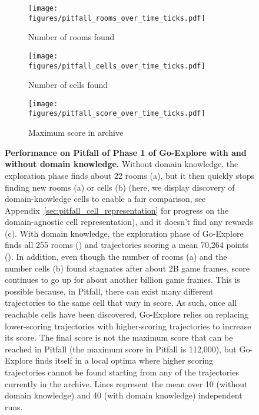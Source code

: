 \documentclass{article}
\begin{document}
\begin{figure}
    \begin{subfigure}[t]{.33\textwidth}
        \centering
        \texttt{[image: figures/pitfall\_rooms\_over\_time\_ticks.pdf]}
        \caption{Number of rooms found}
        \label{fig:pitfall_domain_room}
    \end{subfigure}
    \begin{subfigure}[t]{.33\textwidth}
        \centering
        \texttt{[image: figures/pitfall\_cells\_over\_time\_ticks.pdf]}
        \caption{Number of cells found}
        \label{fig:pitfall_domain_cell}
    \end{subfigure}
    \begin{subfigure}[t]{.33\textwidth}
        \centering
        \texttt{[image: figures/pitfall\_score\_over\_time\_ticks.pdf]}
        \caption{Maximum score in archive}
        \label{fig:pitfall_domain_score}
    \end{subfigure}
    \caption{\textbf{Performance on Pitfall of Phase 1 of Go-Explore with and without domain knowledge.}
    Without domain knowledge, the exploration phase finds about 22 rooms (a), but it then quickly stops finding new rooms (a) or cells (b) (here, we display discovery of domain-knowledge cells to enable a fair comparison, see Appendix~\ref{sec:pitfall_cell_representation} for progress on the domain-agnostic cell representation), and it doesn't find any rewards (c).
    With domain knowledge, the exploration phase of Go-Explore finds all 255 rooms () and trajectories scoring a mean 70,264 points ().
    In addition, even though the number of rooms (a) and the number cells (b) found stagnates after about 2B game frames, score continues to go up for about another billion game frames. This is possible because, in Pitfall, there can exist many different trajectories to the same cell that vary in score. As such, once all reachable cells have been discovered, Go-Explore relies on replacing lower-scoring trajectories with higher-scoring trajectories to increase its score. The final score is not the maximum score that can be reached in Pitfall (the maximum score in Pitfall is 112,000), but Go-Explore finds itself in a local optima where higher scoring trajectories cannot be found starting from any of the trajectories currently in the archive.
    Lines represent the mean over 10 (without domain knowledge) and 40 (with domain knowledge) independent runs.}
    \label{fig:pitfall_explore}
\end{figure}
\end{document}
